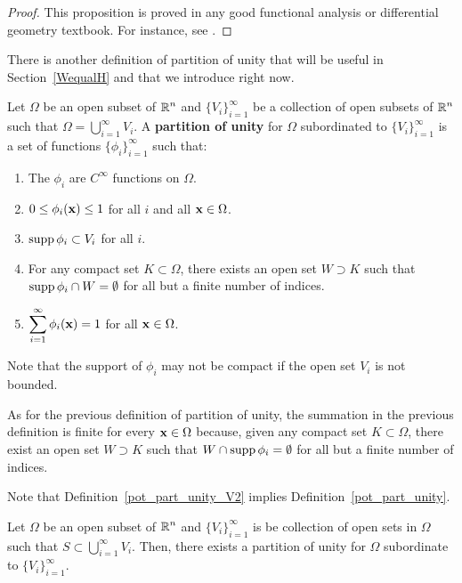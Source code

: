 \begin{proof}
This proposition is proved in any good functional analysis or
differential geometry textbook.  For instance, see \cite{Ad}. 
\end{proof}

There is another definition of partition of unity that will be useful
in Section~\ref{WequalH} and that we introduce right now.

\begin{defn} \label{pot_part_unity_V2}
Let $\Omega$ be an open subset of $\displaystyle \mathbb{R}^n$ and
$\displaystyle \{V_i\}_{i=1}^\infty$
be a collection of open subsets of $\displaystyle \mathbb{R}^n$ such that
$\displaystyle \Omega = \bigcup_{i=1}^\infty V_i$.
A {\bfseries partition of unity}
for $\Omega$ subordinated to $\displaystyle \{V_i\}_{i=1}^\infty$ is a
set of functions $\displaystyle \{\phi_i\}_{i=1}^\infty$ such that:
\begin{enumerate}
\item The $\phi_i$ are $\displaystyle C^\infty$ functions on $\Omega$.
\item $0 \leq \phi_i(\mathbf{x}) \leq 1$ for all $i$ and all $\mathbf{x} \in \Omega$.
\item $\operatorname{supp} \phi_i \subset V_i$ for all $i$.
\item For any compact set $K \subset \Omega$, there exists an open set
$W \supset K$ such that $\operatorname{supp} \phi_i \cap W = \emptyset$ for all but
a finite number of indices.
\item $\displaystyle \sum_{i=1}^\infty \phi_i(\mathbf{x}) = 1$ for all
$\mathbf{x}\in \Omega$.
\end{enumerate}
Note that the support of $\phi_i$ may not be compact if the open set
$V_i$ is not bounded.
\end{defn}

As for the previous definition of partition of unity,
the summation in the previous definition is finite for every
$\mathbf{x} \in \Omega$ because, given any compact set $K\subset \Omega$,
there exist an open set $W \supset K$ such that
$W \cap \operatorname{supp} \phi_i = \emptyset$ for all but a finite number of indices.

Note that Definition~\ref{pot_part_unity_V2} implies
Definition~\ref{pot_part_unity}.

\begin{prop}
Let $\Omega$ be an open subset of $\displaystyle \mathbb{R}^n$ and
$\displaystyle \{ V_i\}_{i=1}^\infty$ is be collection
of open sets in $\Omega$ such that
$\displaystyle S \subset \bigcup_{i=1}^\infty V_i$.
Then, there exists a partition of unity for $\Omega$
subordinate to $\displaystyle \{ V_i\}_{i=1}^\infty$.
\end{prop}

